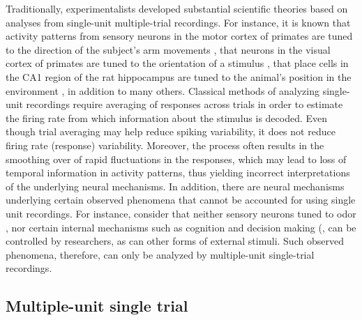 Traditionally, experimentalists developed substantial scientific theories based on analyses from single-unit multiple-trial recordings. For instance, it is known that activity patterns from sensory neurons in the motor cortex of primates are tuned to the direction of the subject's arm movements \cite{Georgopoulos1982}, that neurons in the visual cortex of primates are tuned to the orientation of a stimulus \cite{Hubel1968}, that place cells in the CA1 region of the rat hippocampus are tuned to the animal's position in the environment \cite{OKeefe1971}, in addition to many others.
Classical  methods of analyzing single-unit recordings require averaging of responses across trials in order to estimate the firing rate from which information about the stimulus is decoded. Even though trial averaging may help reduce spiking variability, it does not reduce firing rate (response) variability.
Moreover, the process often results in the smoothing over of rapid fluctuations in the 
responses, which may lead to loss of temporal information in activity patterns, thus yielding incorrect interpretations of the underlying neural mechanisms.
In addition, there are neural mechanisms underlying certain observed phenomena 
that cannot be accounted for using single unit recordings.
For instance, consider that neither sensory neurons tuned to odor \cite{Hopfield1995},
nor certain internal mechanisms such as cognition and decision making (\cite{Redish2016,
Vos2015, Kaufman2014, Mazor2005}, can be controlled by researchers, as can other forms of external stimuli. Such observed phenomena, therefore, can only be analyzed by multiple-unit single-trial recordings. 




\subsection{Multiple-unit single trial}

